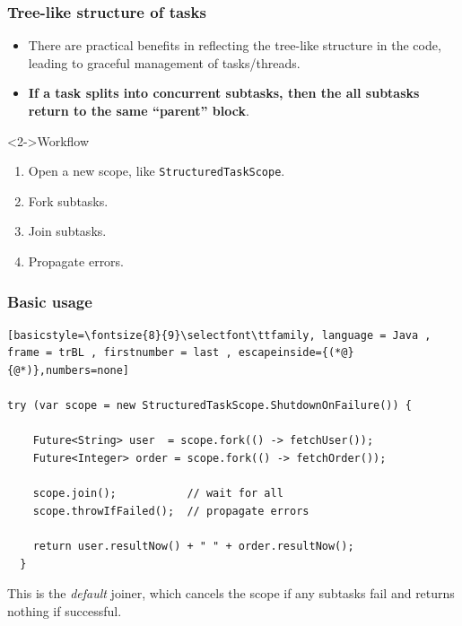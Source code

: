 \documentclass[xcolor={dvipsnames,svgnames},aspectratio=169]{beamer}
\begin{document}
\begin{frame}[fragile]
  \frametitle{Tree-like structure of tasks}
  \begin{itemize}
  \item[\faBook]<1-> There are practical benefits in reflecting the tree-like
    structure in the code, leading to graceful management of tasks/threads.
  \item[\faBook]<1-> \textbf{If a task splits into concurrent subtasks, then
      the all subtasks return to the same ``parent'' block}.
  \end{itemize}
  \vspace{0.2cm}
  \begin{block}<2->{\faLightbulb \quad Workflow}
    \begin{enumerate}
    \item Open a new scope, like \texttt{StructuredTaskScope}.
    \item Fork subtasks.
    \item Join subtasks.
    \item Propagate errors.
    \end{enumerate}
  \end{block}
\end{frame}

\begin{frame}[fragile]
  \frametitle{Basic usage}
  \begin{lstlisting}[basicstyle=\fontsize{8}{9}\selectfont\ttfamily, language = Java ,
frame = trBL , firstnumber = last , escapeinside={(*@}{@*)},numbers=none]

try (var scope = new StructuredTaskScope.ShutdownOnFailure()) {

    Future<String> user  = scope.fork(() -> fetchUser());
    Future<Integer> order = scope.fork(() -> fetchOrder());

    scope.join();           // wait for all
    scope.throwIfFailed();  // propagate errors

    return user.resultNow() + " " + order.resultNow();
  }
\end{lstlisting}

  This is the \emph{default} joiner, which cancels the scope if any subtasks
  fail and returns nothing if successful.

\end{frame}
\end{document}
